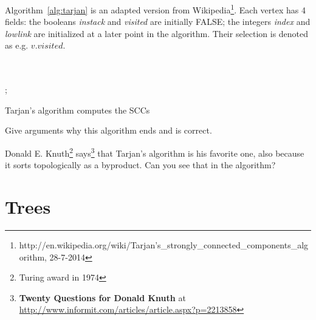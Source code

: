 Algorithm~\ref{alg:tarjan} is an adapted version from
Wikipedia\footnote{
http://en.wikipedia.org/wiki/Tarjan's\_strongly\_connected\_components\_algorithm,
28-7-2014}.
%
Each vertex has 4 fields: the booleans {\em instack} and {\em visited}
are initially FALSE; the integers {\em index} and {\em lowlink} are
initialized at a later point in the algorithm. Their selection is denoted as e.g. $v.visited$.

\begin{algorithm}[h]
\begin{algorithmic}

    \EndFor
\EndFunction
~\\
~\\
       ;
       \EndIf
\EndFor
    \Repeat
    \EndIf
\EndFunction

  \end{algorithmic}
  \caption{Tarjan's algorithm computes the SCCs}
  \label{alg:tarjan}
\end{algorithm}


Give arguments why this algorithm ends and is correct.

Donald E. Knuth\footnote{Turing award in 1974}
says\footnote{{\bf Twenty Questions for Donald Knuth} at
\url{http://www.informit.com/articles/article.aspx?p=2213858}} that Tarjan's
algorithm is his favorite one, also because it sorts topologically as
a byproduct. Can you see that in the algorithm?


\chapter{Trees}

